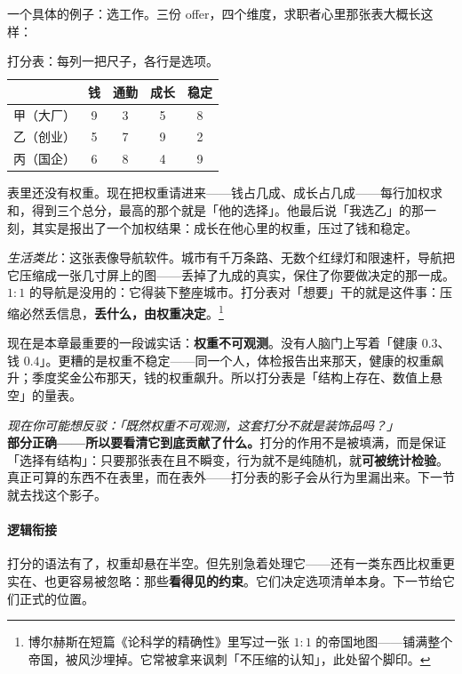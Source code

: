 \documentclass[../../main2.tex]{subfiles}
\begin{document}
	一个具体的例子：选工作。三份 offer，四个维度，求职者心里那张表大概长这样：

	\begin{table}[h]
	\centering
	\begin{tabular}{lcccc}
		\toprule
		 & 钱 & 通勤 & 成长 & 稳定 \\
		\midrule
		甲（大厂） & 9 & 3 & 5 & 8 \\
		乙（创业） & 5 & 7 & 9 & 2 \\
		丙（国企） & 6 & 8 & 4 & 9 \\
		\bottomrule
	\end{tabular}
	\caption{打分表：每列一把尺子，各行是选项。}
	\end{table}

	表里还没有权重。现在把权重请进来——钱占几成、成长占几成——每行加权求和，得到三个总分，最高的那个就是「他的选择」。他最后说「我选乙」的那一刻，其实是报出了一个加权结果：成长在他心里的权重，压过了钱和稳定。

	\textit{生活类比}：这张表像导航软件。城市有千万条路、无数个红绿灯和限速杆，导航把它压缩成一张几寸屏上的图——丢掉了九成的真实，保住了你要做决定的那一成。$1:1$ 的导航是没用的：它得装下整座城市。打分表对「想要」干的就是这件事：压缩必然丢信息，\textbf{丢什么，由权重决定}。\footnote{博尔赫斯在短篇《论科学的精确性》里写过一张 $1:1$ 的帝国地图——铺满整个帝国，被风沙埋掉。它常被拿来讽刺「不压缩的认知」，此处留个脚印。}

	现在是本章最重要的一段诚实话：\textbf{权重不可观测}。没有人脑门上写着「健康 $0.3$、钱 $0.4$」。更糟的是权重不稳定——同一个人，体检报告出来那天，健康的权重飙升；季度奖金公布那天，钱的权重飙升。所以打分表是「结构上存在、数值上悬空」的量表。

	\begin{questionbox}
		\textit{现在你可能想反驳：「既然权重不可观测，这套打分不就是装饰品吗？」}\\
		\textbf{部分正确——所以要看清它到底贡献了什么。}打分的作用不是被填满，而是保证「选择有结构」：只要那张表在且不瞬变，行为就不是纯随机，就\textbf{可被统计检验}。真正可算的东西不在表里，而在表外——打分表的影子会从行为里漏出来。下一节就去找这个影子。
	\end{questionbox}

	\paragraph*{逻辑衔接}
	打分的语法有了，权重却悬在半空。但先别急着处理它——还有一类东西比权重更实在、也更容易被忽略：那些\textbf{看得见的约束}。它们决定选项清单本身。下一节给它们正式的位置。
\end{document}
